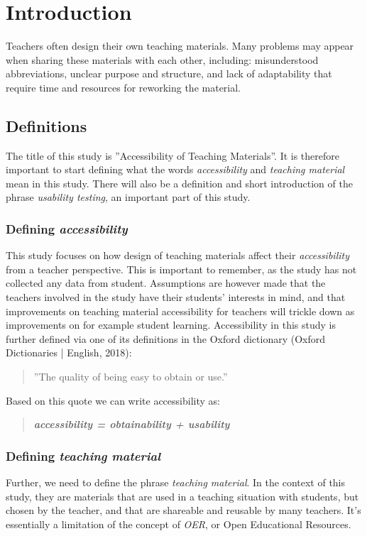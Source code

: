\chapter{Introduction}

Teachers often design their own teaching materials. Many problems may appear when sharing these materials with each other, including: misunderstood abbreviations, unclear purpose and structure, and lack of adaptability that require time and resources for reworking the material.

\section{Definitions}
The title of this study is ''Accessibility of Teaching Materials''. It is therefore important to start defining what the words \textit{accessibility} and \textit{teaching material} mean in this study. There will also be a definition and short introduction of the phrase \textit{usability testing}, an important part of this study.

\subsection{Defining \textit{accessibility}}
This study focuses on how design of teaching materials affect their \textit{accessibility} from a teacher perspective. This is important to remember, as the study has not collected any data from student. Assumptions are however made that the teachers involved in the study have their students' interests in mind, and that improvements on teaching material accessibility for teachers will trickle down as improvements on for example student learning. Accessibility in this study is further defined via one of its definitions in the Oxford dictionary (Oxford Dictionaries | English, 2018):

\begin{quote}
    ''The quality of being easy to obtain or use.''
\end{quote}

Based on this quote we can write accessibility as:
\begin{quote}
\textbf{\textit{accessibility = obtainability + usability}}
\end{quote}

\subsection{Defining \textit{teaching material}}
Further, we need to define the phrase \textit{teaching material}. In the context of this study, they are materials that are used in a teaching situation with students, but chosen by the teacher, and that are shareable and reusable by many teachers. It's essentially a limitation of the concept of \textit{OER}, or Open Educational Resources.

